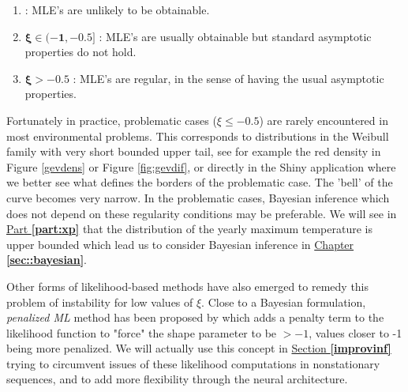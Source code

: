 \begin{enumerate}
	\item\label{it1lik}  : MLE's are unlikely to be obtainable.%
	\item $\boxed{\boldsymbol{\xi\in(-1,-0.5]}}$ : MLE's are usually obtainable but standard asymptotic properties do not hold.
	\item $\boxed{\boldsymbol{\xi>-0.5}}$ : MLE's are regular, in the sense of having the usual asymptotic properties.
\end{enumerate}
Fortunately in practice, problematic cases ($\xi\leq -0.5$) are rarely encountered in most environmental problems. This corresponds to distributions in the Weibull family with very short bounded upper tail, see for example the red density in Figure \ref{gevdens} or Figure \ref{fig:gevdif}, or directly in the Shiny application where we better see what defines the borders of the problematic case. The 'bell' of the curve becomes very narrow.
In the problematic cases, Bayesian inference which does not depend on these regularity conditions may be preferable. We will see in \hyperref[part:xp]{Part \textbf{\ref{part:xp}}} that the distribution of the yearly maximum temperature is upper bounded which lead us to consider Bayesian inference in \hyperref[sec::bayesian]{Chapter \textbf{\ref{sec::bayesian}}}.

Other forms of likelihood-based methods have also emerged to remedy this problem of instability for low values of $\xi$. Close to a Bayesian formulation, \emph{ penalized ML} method has been proposed by \citet{coles_likelihood-based_1999} which adds a penalty term to the likelihood function to "force" the shape parameter to be $>-1$, values closer to -1 being more penalized. We will actually use this concept in \hyperref[improvinf]{Section \textbf{\ref{improvinf}}} trying to circumvent issues of these likelihood computations in nonstationary sequences, and to add more flexibility through the neural architecture.

